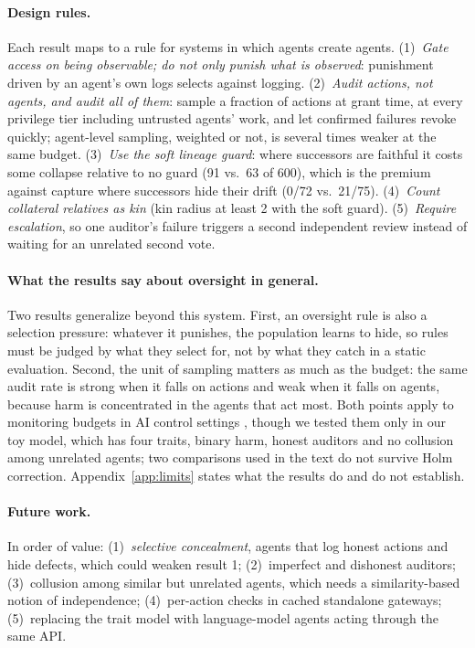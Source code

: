 \documentclass[11pt]{article}
\begin{document}
\paragraph{Design rules.} Each result maps to a rule for systems in which agents create agents.
(1)~\emph{Gate access on being observable; do not only punish what is observed}: punishment
driven by an agent's own logs selects against logging. (2)~\emph{Audit actions, not agents,
and audit all of them}: sample a fraction of actions at grant time, at every privilege tier
including untrusted agents' work, and let confirmed failures revoke quickly; agent-level
sampling, weighted or not, is several times weaker at the same budget. (3)~\emph{Use the soft
lineage guard}: where successors are faithful it costs some collapse relative to no guard
(91 vs.\ 63 of 600), which is the premium against capture where successors hide their drift
(0/72 vs.\ 21/75). (4)~\emph{Count collateral relatives as kin} (kin radius at least 2 with
the soft guard). (5)~\emph{Require escalation}, so one auditor's failure triggers a second
independent review instead of waiting for an unrelated second vote.

\paragraph{What the results say about oversight in general.} Two results generalize beyond
this system. First, an oversight rule is also a selection pressure: whatever it punishes, the
population learns to hide, so rules must be judged by what they select for, not by what they
catch in a static evaluation. Second, the unit of sampling matters as much as the budget:
the same audit rate is strong when it falls on actions and weak when it falls on agents,
because harm is concentrated in the agents that act most. Both points apply to monitoring
budgets in AI control settings \citep{greenblatt2023control}, though we tested them only in
our toy model, which has four traits, binary harm, honest auditors and no collusion among
unrelated agents; two comparisons used in the text do not survive Holm correction.
Appendix~\ref{app:limits} states what the results do and do not establish.

\paragraph{Future work.} In order of value: (1)~\emph{selective concealment}, agents that log
honest actions and hide defects, which could weaken result 1; (2)~imperfect and dishonest
auditors; (3)~collusion among similar but unrelated agents, which needs a similarity-based
notion of independence; (4)~per-action checks in cached standalone gateways; (5)~replacing the
trait model with language-model agents acting through the same API.
\end{document}
